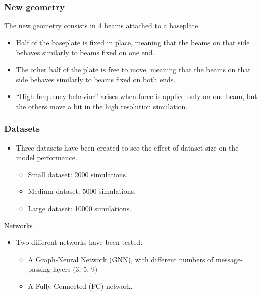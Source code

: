 \documentclass{beamer}
\begin{document}
\begin{frame}
\frametitle{New geometry}
The new geometry consists in 4 beams attached to a baseplate.
\begin{itemize}
    \item Half of the baseplate is fixed in place, meaning that the beams on that side behaves similarly to beams fixed on one end.
    \item The other half of the plate is free to move, meaning that the beams on that side behaves similarly to beams fixed on both ends.
    \item ``High frequency behavior'' arises when force is applied only on one beam, but the others move a bit in the high resolution simulation.
    \end{itemize}
\end{frame}


\begin{frame}
\frametitle{Datasets}
    \begin{itemize}
        \item Three datasets have been created to see the effect of dataset size on the model performance.
        \begin{itemize}
            \item Small dataset: 2000 simulations.
            \item Medium dataset: 5000 simulations.
            \item Large dataset: 10000 simulations.
        \end{itemize}
    \end{itemize}
\end{frame}

\begin{frame}{Networks}
    \begin{itemize}
        \item Two different networks have been tested:
        \begin{itemize}
            \item A Graph-Neural Network (GNN), with different numbers of message-passing layers (3, 5, 9)
            \item A Fully Connected (FC) network.
        \end{itemize}
    \end{itemize}
\end{frame}
    
            
\end{document}
